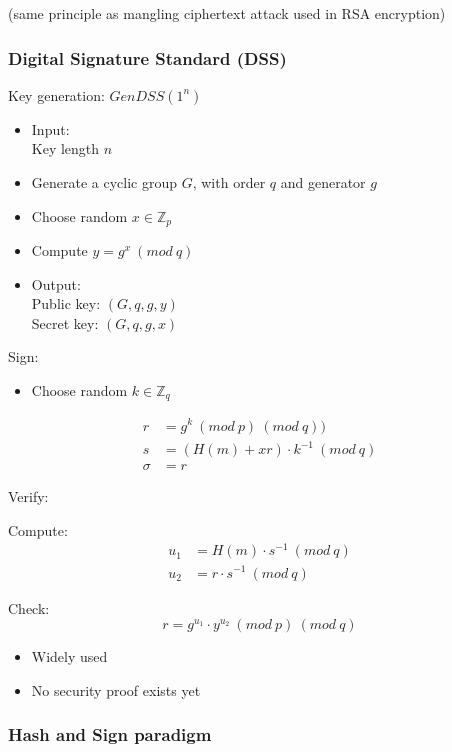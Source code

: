 \documentclass[a4paper]{article}
\begin{document}
(same principle as mangling ciphertext attack used in RSA encryption)

\subsubsection{Digital Signature Standard (DSS)}
\label{sec:dsa_signatures}

Key generation: $GenDSS(1^{n})$
\begin{itemize}
  \item
    Input: \\
    Key length $n$
  \item Generate a cyclic group $G$, with order $q$ and generator $g$
  \item Choose random $x \in \mathbb{Z}_{p}$
  \item Compute $y = g^{x} \: (mod \: q)$
  \item
    Output: \\
    Public key: $(G, q, g, y)$ \\
    Secret key: $(G, q, g, x)$
\end{itemize}

Sign:
\begin{itemize}
  \item Choose random $k \in \mathbb{Z}_{q}$
\end{itemize}
\begin{align*}
       r &= g^{k} \: (mod \: p) \: (mod \: q)) \\
  s &= (H(m) + xr) \cdot k^{-1} \: (mod \: q) \\
  \sigma &= r
\end{align*}

Verify:

Compute:
\begin{align*}
  u_{1} &= H(m) \cdot s^{-1} \: (mod \: q) \\
  u_{2} &= r \cdot s^{-1} \: (mod \: q)
\end{align*}

Check:
\[
  r = g^{u_{1}} \cdot y^{u_{2}} \: (mod \: p) \: (mod \: q)
\]

\begin{itemize}
  \item Widely used
  \item No security proof exists yet
\end{itemize}

\subsubsection{Hash and Sign paradigm}
\end{document}
